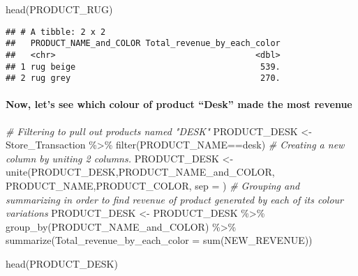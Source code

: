 \documentclass[
]{article}
\newenvironment{Shaded}{\begin{snugshade}}{\end{snugshade}}
\newcommand{\AttributeTok}[1]{\textcolor[rgb]{0.77,0.63,0.00}{#1}}
\newcommand{\CommentTok}[1]{\textcolor[rgb]{0.56,0.35,0.01}{\textit{#1}}}
\newcommand{\FunctionTok}[1]{\textcolor[rgb]{0.00,0.00,0.00}{#1}}
\newcommand{\NormalTok}[1]{#1}
\newcommand{\OtherTok}[1]{\textcolor[rgb]{0.56,0.35,0.01}{#1}}
\newcommand{\SpecialCharTok}[1]{\textcolor[rgb]{0.00,0.00,0.00}{#1}}
\newcommand{\StringTok}[1]{\textcolor[rgb]{0.31,0.60,0.02}{#1}}
\begin{document}
\begin{Shaded}
\begin{Highlighting}[]
\FunctionTok{head}\NormalTok{(PRODUCT\_RUG)}
\end{Highlighting}
\end{Shaded}

\begin{verbatim}
## # A tibble: 2 x 2
##   PRODUCT_NAME_and_COLOR Total_revenue_by_each_color
##   <chr>                                        <dbl>
## 1 rug beige                                     539.
## 2 rug grey                                      270.
\end{verbatim}

\hypertarget{now-lets-see-which-colour-of-product-desk-made-the-most-revenue}{%
\paragraph{Now, let's see which colour of product ``Desk'' made the most
revenue}\label{now-lets-see-which-colour-of-product-desk-made-the-most-revenue}}

\begin{Shaded}
\begin{Highlighting}[]
\CommentTok{\# Filtering to pull out products named "DESK"}
\NormalTok{PRODUCT\_DESK }\OtherTok{\textless{}{-}}\NormalTok{ Store\_Transaction }\SpecialCharTok{\%\textgreater{}\%} \FunctionTok{filter}\NormalTok{(PRODUCT\_NAME}\SpecialCharTok{==}\StringTok{\textquotesingle{}desk\textquotesingle{}}\NormalTok{)}
\CommentTok{\# Creating a new column by uniting 2 columns.}
\NormalTok{PRODUCT\_DESK }\OtherTok{\textless{}{-}} \FunctionTok{unite}\NormalTok{(PRODUCT\_DESK,}\StringTok{\textquotesingle{}PRODUCT\_NAME\_and\_COLOR\textquotesingle{}}\NormalTok{, PRODUCT\_NAME,PRODUCT\_COLOR, }\AttributeTok{sep =} \StringTok{\textquotesingle{} \textquotesingle{}}\NormalTok{)}
\CommentTok{\# Grouping and summarizing in order to find revenue of product generated by each of its colour variations}
\NormalTok{PRODUCT\_DESK }\OtherTok{\textless{}{-}}\NormalTok{ PRODUCT\_DESK }\SpecialCharTok{\%\textgreater{}\%} \FunctionTok{group\_by}\NormalTok{(PRODUCT\_NAME\_and\_COLOR) }\SpecialCharTok{\%\textgreater{}\%}
  \FunctionTok{summarize}\NormalTok{(}\AttributeTok{Total\_revenue\_by\_each\_color =} \FunctionTok{sum}\NormalTok{(NEW\_REVENUE))}
\end{Highlighting}
\end{Shaded}

\begin{Shaded}
\begin{Highlighting}[]
\FunctionTok{head}\NormalTok{(PRODUCT\_DESK)}
\end{Highlighting}
\end{Shaded}
\end{document}

